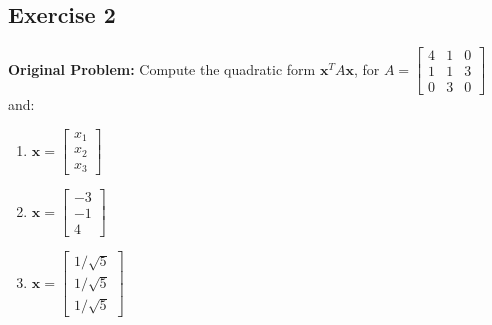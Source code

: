 \documentclass[11pt, letterpaper]{article}
\theoremstyle{definition}
\theoremstyle{remark}
\begin{document}
\subsection*{Exercise 2}
\textbf{Original Problem:} Compute the quadratic form $\mathbf{x}^T A \mathbf{x}$, for $A = \begin{bmatrix} 4 & 1 & 0 \\ 1 & 1 & 3 \\ 0 & 3 & 0 \end{bmatrix}$ and:
\begin{enumerate}[label=\alph*.]
    \item $\mathbf{x} = \begin{bmatrix} x_1 \\ x_2 \\ x_3 \end{bmatrix}$
    \item $\mathbf{x} = \begin{bmatrix} -3 \\ -1 \\ 4 \end{bmatrix}$
    \item $\mathbf{x} = \begin{bmatrix} 1/\sqrt{5} \\ 1/\sqrt{5} \\ 1/\sqrt{5} \end{bmatrix}$
\end{enumerate}
\end{document}
